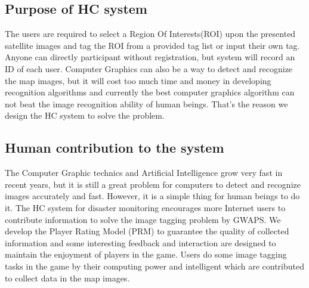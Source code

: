   \subsection{Purpose of HC system}
  The users are required to select a Region Of Interests(ROI) upon the presented satellite images 
  and tag the ROI from a provided tag list or input their own tag. Anyone can directly participant 
  without registration, but system will record an ID of each user.
  Computer Graphics can also be a way to detect and recognize the map images, but it will cost 
  too much time and money in developing recognition algorithms and currently the best 
  computer graphics algorithm can not beat the image recognition ability of human beings. 
  That's the reason we design the HC system to solve the problem.

  \subsection{Human contribution to the system}
  The Computer Graphic technics and Artificial Intelligence grow very fast in recent years, 
  but it is still a great problem for computers to detect and recognize images accurately and fast. 
  However, it is a simple thing for human beings to do it.
  The HC system for disaster monitoring encourages more Internet users to contribute information 
  to solve the image tagging problem by GWAPS. 
  We develop the Player Rating Model (PRM) to guarantee the quality of collected information 
  and some interesting feedback and interaction are designed to maintain the enjoyment of players in the game.
  Users do some image tagging tasks in the game by their computing power and intelligent 
  which are contributed to collect data in the map images.

